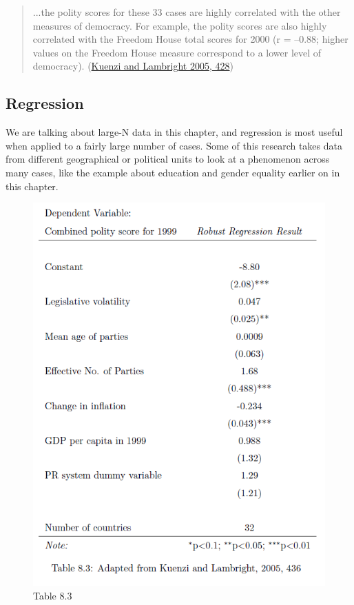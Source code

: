 \documentclass{book}
\begin{document}
\begin{quote}
...the polity scores for these 33 cases are highly correlated with the other
measures of democracy. For example, the polity scores are also highly
correlated with the Freedom House total scores for 2000 (r = --0.88; higher
values on the Freedom House measure correspond to a lower level of democracy).
(\protect\hyperlink{ref-kuenziPartySystemsDemocratic2005}{Kuenzi and Lambright
2005, 428})
\end{quote}

\hypertarget{regression-1}{%
\subsection{Regression}\label{regression-1}}

We are talking about large-N data in this chapter, and regression is most
useful when applied to a fairly large number of cases. Some of this research
takes data from different geographical or political units to look at a
phenomenon across many cases, like the example about education and gender
equality earlier on in this chapter.

\begin{figure}
\centering
\includegraphics{images/largen/table8.3.png}
\caption{Table 8.3}
\end{figure}
\end{document}
